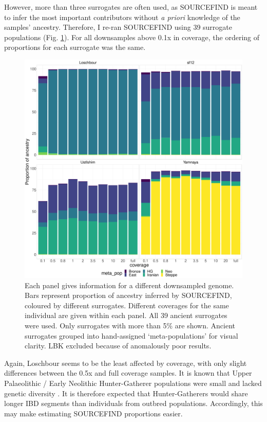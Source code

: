 {However, more than three surrogates are often used, as SOURCEFIND is meant to infer the most important contributors without \textit{a priori} knowledge of the samples' ancestry. Therefore, I re-ran SOURCEFIND using 39 surrogate populations (Fig. \ref{fig:SOURCEFIND_AllPSop_downsampled}). For all downsamples above 0.1x in coverage, the ordering of proportions for each surrogate was the same. 

\begin{figure}[htp]
    \centering
    \includegraphics[width=1.0\textwidth]{../images/chapter1/Allpops_SF_downsampled.pdf}
    \caption{Each panel gives information for a different downsampled genome. Bars represent proportion of ancestry inferred by SOURCEFIND, coloured by different surrogates. Different coverages for the same individual are given within each panel. All 39 ancient surrogates were used. Only surrogates with more than 5\% are shown. Ancient surrogates grouped into hand-assigned `meta-populations' for visual clarity. LBK excluded because of anomalously poor results.}
    \label{fig:SOURCEFIND_AllPSop_downsampled}
\end{figure}

Again, Loschbour seems to be the least affected by coverage, with only slight differences between the 0.5x and full coverage samples. It is known that Upper Palaeolithic / Early Neolithic Hunter-Gatherer populations were small and lacked genetic diversity \cite{excoffier1999hunter, Lazaridis2014, Fu2016}. It is therefore expected that Hunter-Gatherers would share longer IBD segments than individuals from outbred populations. Accordingly, this may make estimating SOURCEFIND proportions easier.


}
